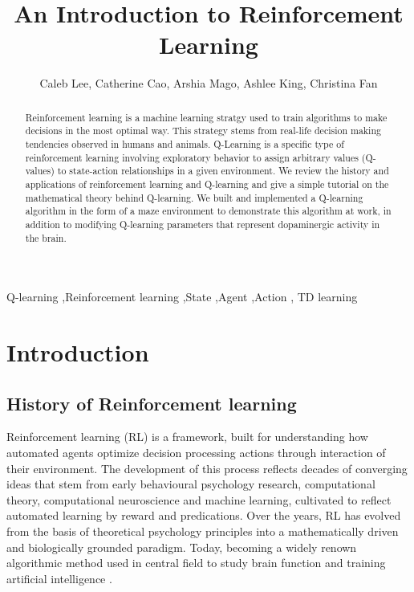 \documentclass[
  authoryear,
  preprint]{elsarticle}
\begin{document}
\begin{frontmatter}
\title{An Introduction to Reinforcement Learning}
\author[1]{Caleb Lee, Catherine Cao, Arshia Mago, Ashlee King, Christina
Fan%
%
}




        
\begin{abstract}
Reinforcement learning is a machine learning stratgy used to train
algorithms to make decisions in the most optimal way. This strategy
stems from real-life decision making tendencies observed in humans and
animals. Q-Learning is a specific type of reinforcement learning
involving exploratory behavior to assign arbitrary values (Q-values) to
state-action relationships in a given environment. We review the history
and applications of reinforcement learning and Q-learning and give a
simple tutorial on the mathematical theory behind Q-learning. We built
and implemented a Q-learning algorithm in the form of a maze environment
to demonstrate this algorithm at work, in addition to modifying
Q-learning parameters that represent dopaminergic activity in the brain.
\end{abstract}





\begin{keyword}
    Q-learning \sep Reinforcement
learning \sep State \sep Agent \sep Action \sep 
    TD learning
\end{keyword}
\end{frontmatter}
    

\section{Introduction}\label{introduction}

\subsection{History of Reinforcement
learning}\label{history-of-reinforcement-learning}

Reinforcement learning (RL) is a framework, built for understanding how
automated agents optimize decision processing actions through
interaction of their environment. The development of this process
reflects decades of converging ideas that stem from early behavioural
psychology research, computational theory, computational neuroscience
and machine learning, cultivated to reflect automated learning by reward
and predications. Over the years, RL has evolved from the basis of
theoretical psychology principles into a mathematically driven and
biologically grounded paradigm. Today, becoming a widely renown
algorithmic method used in central field to study brain function and
training artificial intelligence \citep{SuttonBarto2020}.
\end{document}
